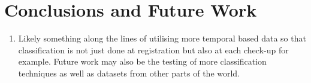 \documentclass{sig-alternate-05-2015}
\begin{document}
	\section{Conclusions and Future Work}
	\begin{enumerate}
		\item Likely something along the lines of utilising more temporal based data so that classification is not just done at registration but also at each check-up for example. Future work may also be the testing of more classification techniques as well as datasets from other parts of the world.
	\end{enumerate}
	
	
\end{document}
